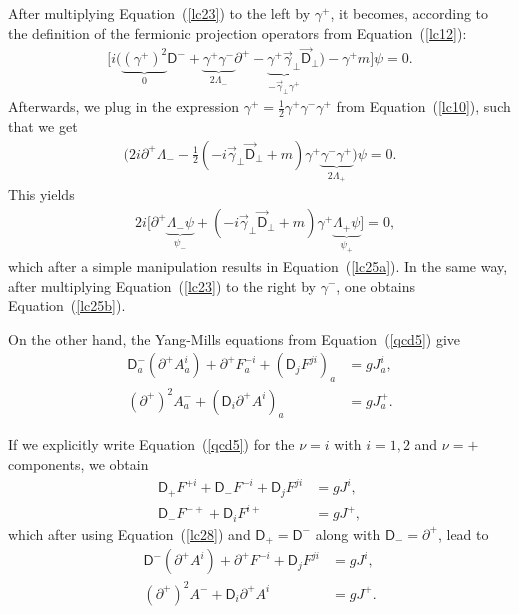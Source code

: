 \begin{note}\noindent
After multiplying Equation~(\cref{lc23}) to the left by $\gamma^+$, it becomes, according to the definition of the fermionic projection operators from Equation~(\cref{lc12}):
\begin{align*}
\Biggl[i\Biggl(\underbrace{(\gamma^+)^2}_0\textsf{D}^-+\underbrace{\gamma^+\gamma^-}_{2\Lambda_-}\partial^+-\underbrace{\gamma^+\vec{\gamma}_\perp}_{-\vec{\gamma}_\perp\gamma^+}\vec{\textsf{D}}_\perp\Biggr)-\gamma^+m\Biggr]\psi=0.
\end{align*}
Afterwards, we plug in the expression $\gamma^+=\frac{1}{2}\gamma^+\gamma^-\gamma^+$ from Equation~(\cref{lc10}), such that we get
\begin{align*}
\Biggl(2i\partial^+\Lambda_--\frac{1}{2}(-i\vec{\gamma}_\perp\vec{\textsf{D}}_\perp+m)\gamma^+\underbrace{\gamma^-\gamma^+}_{2\Lambda_+}\Biggr)\psi=0.
\end{align*}
This yields
\begin{align*}
&2i\Biggl[\partial^+\underbrace{\Lambda_-\psi}_{\psi_-}+(-i\vec{\gamma}_\perp\vec{\textsf{D}}_\perp+m)\gamma^+\underbrace{\Lambda_+\psi}_{\psi_+}\Biggr]=0,
\end{align*}
which after a simple manipulation results in Equation~(\cref{lc25a}). In the same way, after multiplying Equation~(\cref{lc23}) to the right by $\gamma^-$, one obtains Equation~(\cref{lc25b}).\\
\end{note}

\noindent
On the other hand, the Yang-Mills equations from Equation~(\cref{qcd5}) give 
\begin{subequations}
\begin{align}
\textsf{D}^-_a\left(\partial^+A_a^i\right)+\partial^+F^{-i}_a+\left(\textsf{D}_jF^{ji}\right)_a&=gJ_a^i,\label{lc26a}\\
\left(\partial^+\right)^2A_a^-+\left(\textsf{D}_i\partial^+A^i\right)_a&=gJ^+_a. \label{lc26b}
\end{align}
\end{subequations}

\begin{note}\noindent
If we explicitly write Equation~(\cref{qcd5}) for the $\nu=i$ with $i=1,2$ and $\nu=+$ components, we obtain
\begin{align*}
\textsf{D}_+F^{+i}+\textsf{D}_-F^{-i}+\textsf{D}_jF^{ji}&=gJ^i,\\ 
\textsf{D}_-F^{-+}+\textsf{D}_iF^{i+}&=gJ^+,
\end{align*}
which after using Equation~(\cref{lc28}) and $\textsf{D}_+=\textsf{D}^-$ along with $\textsf{D}_-=\partial^+$, lead to
\begin{align*}
\textsf{D}^-\left(\partial^+A^i\right)+\partial^+F^{-i}+\textsf{D}_jF^{ji}&=gJ^i,\\
\left(\partial^+\right)^2A^-+\textsf{D}_i\partial^+A^i&=gJ^+.
\end{align*}
\end{note}


